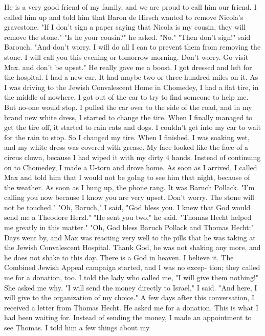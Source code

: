 He is a very good friend of my family, and we are proud to call him 
our friend.
I called him up and told him that Baron de Hirsch wanted to 
remove Nicola's gravestone.
"If I don't sign a paper saying that 
Nicola is my cousin, they will remove the stone."
"Is he your cousin?"
he asked.
"No."
"Then don't sign!"
said Barouch.
"And don't worry.
I will do 
all I can to prevent them from removing the stone.
I will call you 
this evening or tomorrow morning.
Don't worry.
Go visit Max.
and 
don't be upset."
He really gave me a boost.
I got dressed and left for the hospital.
I had a new car.
It 
had maybe two or three hundred miles on it.
As I was driving to the 
Jewish Convalescent Home in Chomedey, I had a flat tire, in the 
middle of nowhere.
I got out of the car to try to find someone to 
help me.
But no-one would stop.
I pulled the car over to the side 
of the road, and in my brand new white dress, I started to change the 
tire.
When I finally managed to get the tire off, it started to 
rain cats and dogs.
I couldn't get into my car to wait for the rain 
to stop.
So I changed my tire.
When I finished, I was soaking wet, 
and my white dress was covered with grease.
My face looked like the 
face of a circus clown, because I had wiped it with my dirty 4 hands.
Instead of continuing on to Chomedey, I made a U-torn and drove home.
As soon as I arrived, I called Max and told him that I would not be 
goIng to see him that night, because of the weather.
As soon as I hung up, the phone rang.
It was Baruch Pollack.
"I'm calling you now because I know you are very upset.
Don't 
worry.
The stone will not be touched."
"Oh, Baruch," I said, "God bless you.
I knew that God would 
send me a Theodore Herzl."
"He sent you two," he said.
"Thomas Hecht helped me greatly in 
this matter."
"Oh, God bless Baruch Pollack and Thomas Hecht:" 
Days went by, and Max was reacting very well to the pills that 
he was taking at the Jewish Convalescent Hospital.
Thank God, he was 
not shaking any more, and he does not shake to this day.
There is a 
God in heaven.
I believe it.
The Combined Jewish Appeal campaign started, and I was no excep-
tion; they called me for a donation, too.
I told the lady who 
called me, "I will give them nothing!"
She asked me why.
"I will send the money directly to Israel," I said.
"And here, 
I will give to the organization of my choice."
A few days after this conversation, I received a 
letter from Thomas Hecht.
He asked me for a donation.
This is 
what I had been waiting for.
Instead of sending the money, I made 
an appointment to see Thomas.
I told him a few things about my 
